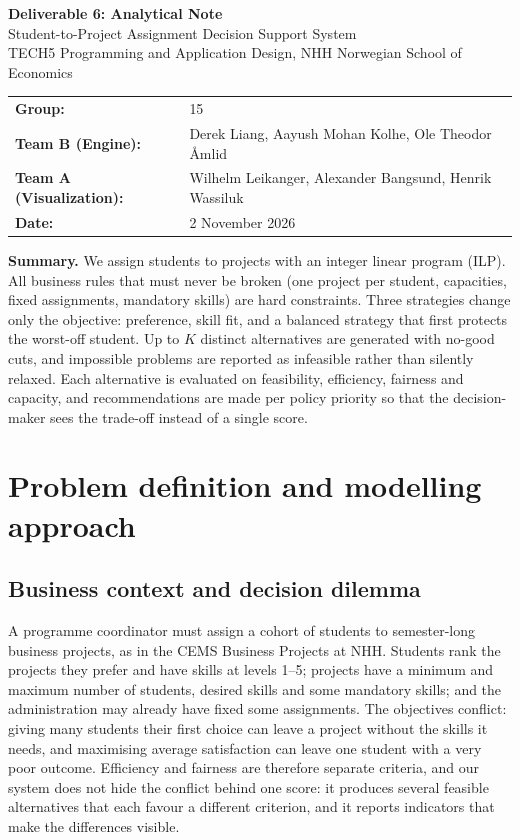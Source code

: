 \documentclass[11pt,a4paper]{article}
\begin{document}
\begin{center}
{\LARGE\bfseries Deliverable 6: Analytical Note}\\[4pt]
{\large Student-to-Project Assignment Decision Support System}\\[10pt]
TECH5 Programming and Application Design, NHH Norwegian School of Economics\\[8pt]
\begin{tabular}{ll}
\textbf{Group:} & 15\\
\textbf{Team B (Engine):} & Derek Liang, Aayush Mohan Kolhe, Ole Theodor Åmlid\\
\textbf{Team A (Visualization):} & Wilhelm Leikanger, Alexander Bangsund, Henrik Wassiluk\\
\textbf{Date:} & 2 November 2026
\end{tabular}
\end{center}

\vspace{6pt}
\noindent\textbf{Summary.}
We assign students to projects with an integer linear program (ILP). All
business rules that must never be broken (one project per student, capacities,
fixed assignments, mandatory skills) are hard constraints. Three strategies
change only the objective: preference, skill fit, and a balanced strategy that
first protects the worst-off student. Up to $K$ distinct alternatives are
generated with no-good cuts, and impossible problems are reported as
infeasible rather than silently relaxed. Each alternative is evaluated on
feasibility, efficiency, fairness and capacity, and recommendations are made
per policy priority so that the decision-maker sees the trade-off instead of a
single score.

\section{Problem definition and modelling approach}

\subsection{Business context and decision dilemma}

A programme coordinator must assign a cohort of students to semester-long
business projects, as in the CEMS Business Projects at NHH. Students rank the
projects they prefer and have skills at levels 1--5; projects have a minimum
and maximum number of students, desired skills and some mandatory skills; and
the administration may already have fixed some assignments. The objectives
conflict: giving many students their first choice can leave a project without
the skills it needs, and maximising average satisfaction can leave one student
with a very poor outcome. Efficiency and fairness are therefore separate
criteria, and our system does not hide the conflict behind one score: it produces several
feasible alternatives that each favour a different criterion, and it reports
indicators that make the differences visible.
\end{document}
